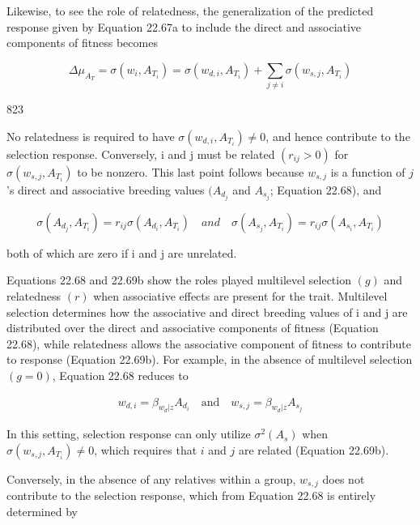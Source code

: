 \documentclass{article}
\begin{document}
Likewise, to see the role of relatedness, the generalization of the predicted response given by Equation 22.67a to include the direct and associative components of fitness becomes

\begin{equation}
\Delta\mu_{A_{T}}=\sigma(w_{i},A_{T_{i}})=\sigma(w_{d,i},A_{T_{i}})+\sum_{j\neq i}\sigma(w_{s,j},A_{T_{i}})
\tag{22.69a}
\label{eq:22_69a}
\end{equation}

823

No relatedness is required to have  $ \sigma(w_{d,i}, A_{T_i}) \neq 0 $, and hence contribute to the selection response. Conversely, i and j must be related  $ (r_{ij} > 0) $ for  $ \sigma(w_{s,j}, A_{T_i}) $ to be nonzero. This last point follows because  $ w_{s,j} $ is a function of  $ j $'s direct and associative breeding values  $ (A_{d_j} $ and  $ A_{s_j} $; Equation 22.68), and

\begin{equation}
\sigma(A_{d_{j}},A_{T_{i}})=r_{ij}\sigma(A_{d_{i}},A_{T_{i}})\quad and\quad\sigma(A_{s_{j}},A_{T_{i}})=r_{ij}\sigma(A_{s_{i}},A_{T_{i}})
\tag{22.69b}
\label{eq:22_69b}
\end{equation}

both of which are zero if i and j are unrelated.

Equations 22.68 and 22.69b show the roles played multilevel selection  $ (g) $ and relatedness  $ (r) $ when associative effects are present for the trait. Multilevel selection determines how the associative and direct breeding values of i and j are distributed over the direct and associative components of fitness (Equation 22.68), while relatedness allows the associative component of fitness to contribute to response (Equation 22.69b). For example, in the absence of multilevel selection  $ (g = 0) $, Equation 22.68 reduces to

\begin{equation}
\begin{array}{r}{w_{d,i}=\beta_{w_{d}|z}A_{d_{i}}\quad\mathrm{a n d}\quad w_{s,j}=\beta_{w_{d}|z}A_{s_{j}}}\end{array}
\tag{22.70a}
\label{eq:22_70a}
\end{equation}

In this setting, selection response can only utilize  $ \sigma^2(A_s) $ when  $ \sigma(w_{s,j}, A_{T_i}) \neq 0 $, which requires that  $ i $ and  $ j $ are related (Equation 22.69b).

Conversely, in the absence of any relatives within a group,  $ w_{s,j} $ does not contribute to the selection response, which from Equation 22.68 is entirely determined by
\end{document}
